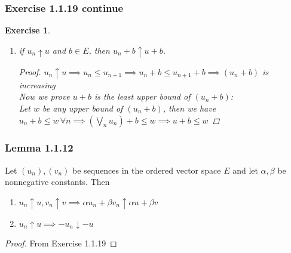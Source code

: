 \documentclass[11pt,xcolor={dvipsnames},hyperref={pdftex,pdfpagemode=UseNone,hidelinks,pdfdisplaydoctitle=true},usepdftitle=false]{beamer}
\newtheorem{exercise}{Exercise}[section]
\begin{document}
\begin{frame}
\frametitle{Exercise 1.1.19 continue}
\begin{exercise}
\begin{enumerate}
\item[(ii)] if $u_n \uparrow u$ and $b \in E$, then $u_n + b \uparrow u + b$.
\begin{proof}
$u_n\uparrow u\implies u_n\le u_{n+1}\implies u_n+b\le u_{n+1}+b\implies (u_n+b)$ is increasing\\
Now we prove $u+b$ is the least upper bound of $(u_n+b)$:\\
Let $w$ be any upper bound of $(u_n+b)$, then we have $u_n+b\le w\,\forall n\implies (\bigvee_n u_n) + b\le w \implies u+b\le w$
\end{proof}
\end{enumerate}
\end{exercise}
\end{frame}

\begin{frame}
\frametitle{Lemma 1.1.12}

Let $(u_n), (v_n)$ be sequences in the ordered vector space $E$ and let $\alpha, \beta$ be nonnegative constants. Then

\begin{enumerate}
\item $u_n\uparrow u, v_n\uparrow v\implies \alpha u_n+\beta v_n \uparrow \alpha u + \beta v$
\item $u_n\uparrow u\implies -u_n\downarrow -u$
\end{enumerate}
\begin{proof}
From Exercise 1.1.19
\end{proof}
\end{frame}
\end{document}
